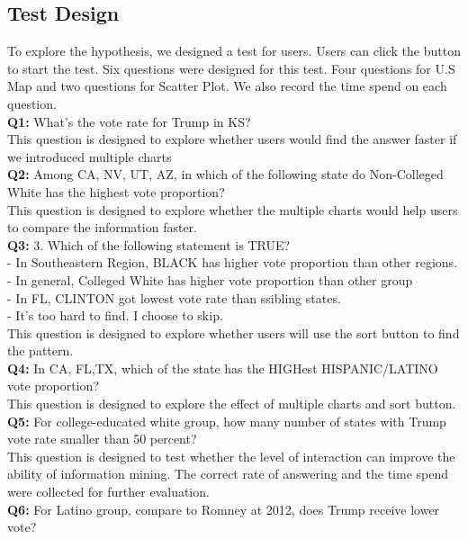 \documentclass[9pt,journal,compsoc]{IEEEtran}
\begin{document}
\subsection{Test Design}
To explore the hypothesis, we designed a test for users. Users can click the button to start the test. Six questions were designed for this test. Four questions for U.S Map and two questions for Scatter Plot. We also record the time spend on each question.\\
\textbf{Q1: }What's the vote rate for Trump in KS?\\
This question is designed to explore whether users would find the answer faster if we introduced multiple charts\\
\textbf{Q2: }Among CA, NV, UT, AZ, in which of the following state do Non-Colleged White has the highest vote proportion?\\
This question is designed to explore whether the multiple charts would help users to compare the information faster.\\
\textbf{Q3: } 3. Which of the following statement is TRUE?\\
- In Southeastern Region, BLACK has higher vote proportion than other regions.\\
- In general, Colleged White has higher vote proportion than other group\\
- In FL, CLINTON got lowest vote rate than ssibling states.\\
- It's too hard to find. I choose to skip.\\
This question is designed to explore whether users will use the sort button to find the pattern.\\
\textbf{Q4: }In CA, FL,TX, which of the state has the HIGHest HISPANIC/LATINO vote proportion?\\
This question is designed to explore the effect of multiple charts and sort button.\\
\textbf{Q5: }For college-educated white group, how many number of states with Trump vote rate smaller than 50 percent?\\
This question is designed to test whether the level of interaction can improve the ability of information mining. The correct rate of answering and the time spend were collected for further evaluation. \\
\textbf{Q6: }For Latino group, compare to Romney at 2012, does Trump receive lower vote?\\
\end{document}
